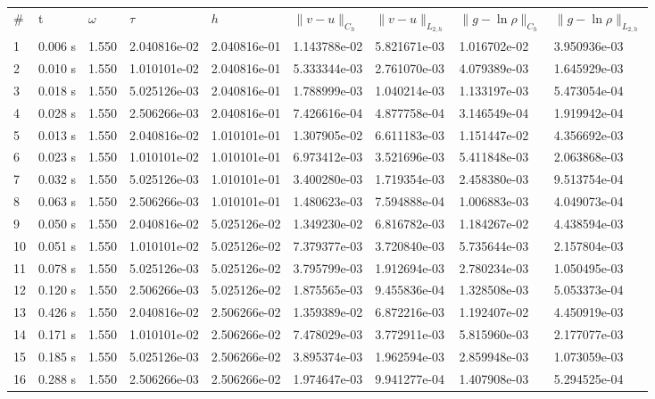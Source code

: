 \documentclass[12pt]{article}
\begin{document}
\begin{center}
\begin{tabular}{lllllllll}
\# & t & $\omega$ & $\tau$ & $h$ & $\|v - u\|_{C_h}$ & $\|v - u\|_{L_{2,h}}$ & $\|g - \ln\rho\|_{C_h}$ & $\|g - \ln\rho\|_{L_{2,h}}$ \\

1&      0.006 s&      1.550&      2.040816e-02&      2.040816e-01&      1.143788e-02&      5.821671e-03&      1.016702e-02&      3.950936e-03\\
2&      0.010 s&      1.550&      1.010101e-02&      2.040816e-01&      5.333344e-03&      2.761070e-03&      4.079389e-03&      1.645929e-03\\
3&      0.018 s&      1.550&      5.025126e-03&      2.040816e-01&      1.788999e-03&      1.040214e-03&      1.133197e-03&      5.473054e-04\\
4&      0.028 s&      1.550&      2.506266e-03&      2.040816e-01&      7.426616e-04&      4.877758e-04&      3.146549e-04&      1.919942e-04\\
5&      0.013 s&      1.550&      2.040816e-02&      1.010101e-01&      1.307905e-02&      6.611183e-03&      1.151447e-02&      4.356692e-03\\
6&      0.023 s&      1.550&      1.010101e-02&      1.010101e-01&      6.973412e-03&      3.521696e-03&      5.411848e-03&      2.063868e-03\\
7&      0.032 s&      1.550&      5.025126e-03&      1.010101e-01&      3.400280e-03&      1.719354e-03&      2.458380e-03&      9.513754e-04\\
8&      0.063 s&      1.550&      2.506266e-03&      1.010101e-01&      1.480623e-03&      7.594888e-04&      1.006883e-03&      4.049073e-04\\
9&      0.050 s&      1.550&      2.040816e-02&      5.025126e-02&      1.349230e-02&      6.816782e-03&      1.184267e-02&      4.438594e-03\\
10&      0.051 s&      1.550&      1.010101e-02&      5.025126e-02&      7.379377e-03&      3.720840e-03&      5.735644e-03&      2.157804e-03\\
11&      0.078 s&      1.550&      5.025126e-03&      5.025126e-02&      3.795799e-03&      1.912694e-03&      2.780234e-03&      1.050495e-03\\
12&      0.120 s&      1.550&      2.506266e-03&      5.025126e-02&      1.875565e-03&      9.455836e-04&      1.328508e-03&      5.053373e-04\\
13&      0.426 s&      1.550&      2.040816e-02&      2.506266e-02&      1.359389e-02&      6.872216e-03&      1.192407e-02&      4.450919e-03\\
14&      0.171 s&      1.550&      1.010101e-02&      2.506266e-02&      7.478029e-03&      3.772911e-03&      5.815960e-03&      2.177077e-03\\
15&      0.185 s&      1.550&      5.025126e-03&      2.506266e-02&      3.895374e-03&      1.962594e-03&      2.859948e-03&      1.073059e-03\\
16&      0.288 s&      1.550&      2.506266e-03&      2.506266e-02&      1.974647e-03&      9.941277e-04&      1.407908e-03&      5.294525e-04\\
\end{tabular}
\end{center}
\end{document}
